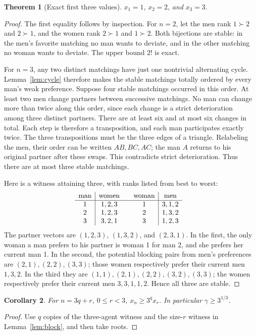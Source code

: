 \documentclass[11pt,a4paper]{article}
\newtheorem{theorem}{Theorem}[section]
\newtheorem{corollary}[theorem]{Corollary}
\theoremstyle{remark}\newtheorem{remark}[theorem]{Remark}
\begin{document}
\begin{theorem}[Exact first three values]
$x_1=1$, $x_2=2$, and $x_3=3$.
\end{theorem}
\begin{proof}
The first equality follows by inspection. For $n=2$, let the men rank $1\succ2$ and $2\succ1$, and the women rank $2\succ1$ and $1\succ2$. Both bijections are stable: in the men's favorite matching no man wants to deviate, and in the other matching no woman wants to deviate. The upper bound $2!$ is exact.

For $n=3$, any two distinct matchings have just one nontrivial alternating cycle. Lemma~\ref{lem:cycle} therefore makes the stable matchings totally ordered by every man's weak preference. Suppose four stable matchings occurred in this order. At least two men change partners between successive matchings. No man can change more than twice along this order, since each change is a strict deterioration among three distinct partners. There are at least six and at most six changes in total. Each step is therefore a transposition, and each man participates exactly twice. The three transpositions must be the three edges of a triangle. Relabeling the men, their order can be written $AB,BC,AC$; the man $A$ returns to his original partner after these swaps. This contradicts strict deterioration. Thus there are at most three stable matchings.

Here is a witness attaining three, with ranks listed from best to worst:
\[
\begin{array}{c|c@{\qquad}c|c}
\text{man}&\text{women}&\text{woman}&\text{men}\\\hline
1&1,2,3&1&3,1,2\\
2&1,2,3&2&1,3,2\\
3&3,2,1&3&1,2,3
\end{array}
\]
The partner vectors are $(1,2,3)$, $(1,3,2)$, and $(2,3,1)$. In the first, the only woman a man prefers to his partner is woman 1 for man 2, and she prefers her current man 1. In the second, the potential blocking pairs from men's preferences are $(2,1),(2,2),(3,3)$; those women respectively prefer their current men $1,3,2$. In the third they are $(1,1),(2,1),(2,2),(3,2),(3,3)$; the women respectively prefer their current men $3,3,1,1,2$. Hence all three are stable.
\end{proof}

\begin{corollary}
For $n=3q+r$, $0\le r<3$, $x_n\ge3^q x_r$. In particular $\gamma\ge3^{1/3}$.
\end{corollary}
\begin{proof}
Use $q$ copies of the three-agent witness and the size-$r$ witness in Lemma~\ref{lem:block}, and then take roots.
\end{proof}
\end{document}

